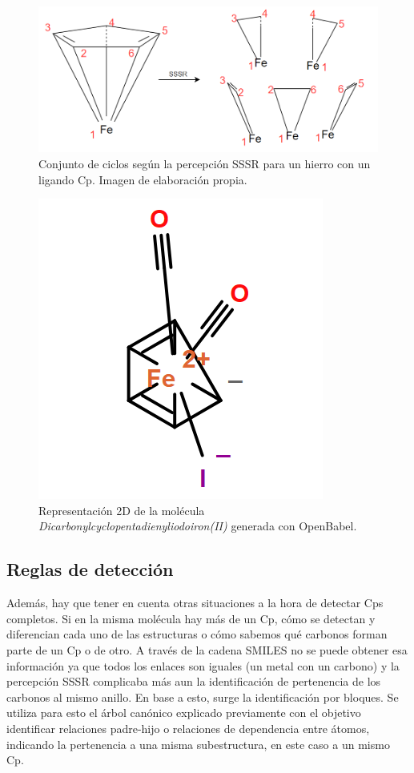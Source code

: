 \begin{figure}[h!]
    \centering
    \includegraphics[scale=0.4]{imagenes/diseno/dibujo/sssr_iron.png}
    \caption{Conjunto de ciclos según la percepción SSSR para un hierro con un ligando Cp. Imagen de elaboración propia.}
    \label{fig:sssr_iron(II)}
\end{figure}


\begin{figure}[h!]
    \centering
    \includegraphics[scale=0.5]{imagenes/diseno/dibujo/iron(II)_Original.png}
    \caption{Representación 2D de la molécula \textit{Dicarbonylcyclopentadienyliodoiron(II)} generada con OpenBabel.}
    \label{fig:iron(II)Original}
\end{figure}

\subsection{Reglas de detección}

Además, hay que tener en cuenta otras situaciones a la hora de detectar Cps completos. Si en la misma molécula hay más de un Cp, cómo se detectan y diferencian cada uno de las estructuras o cómo sabemos qué carbonos forman parte de un Cp o de otro. A través de la cadena SMILES no se puede obtener esa información ya que todos los enlaces son iguales (un metal con un carbono) y la percepción SSSR complicaba más aun la identificación de pertenencia de los carbonos al mismo anillo. En base a esto, surge la identificación por bloques. Se utiliza para esto el árbol canónico explicado previamente con el objetivo identificar relaciones padre-hijo o relaciones de dependencia entre átomos, indicando la pertenencia a una misma subestructura, en este caso a un mismo Cp.

